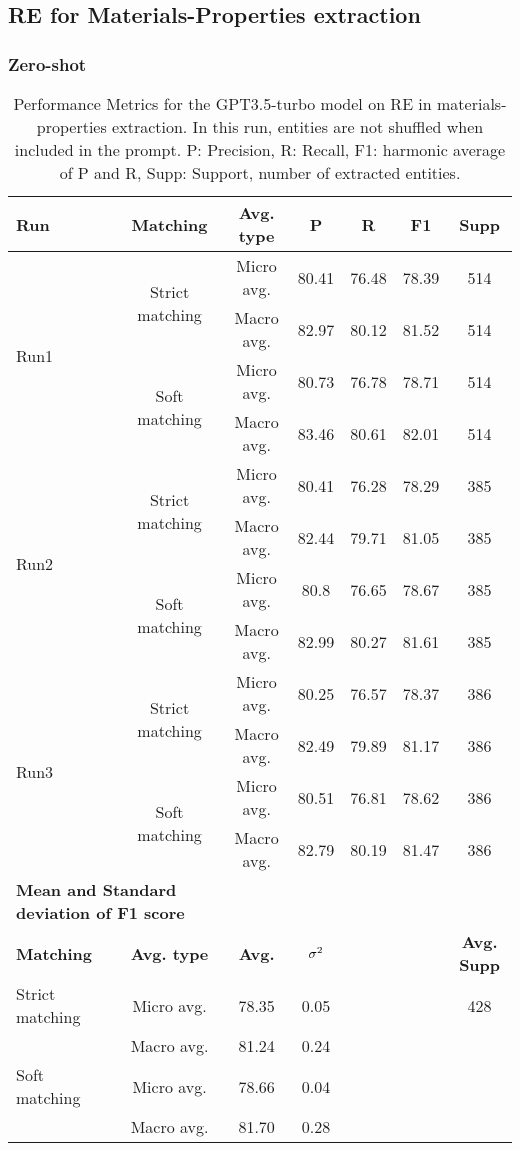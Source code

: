 \clearpage
\subsection{RE for Materials-Properties extraction}

\subsubsection{Zero-shot}

\begin{table}[htbp]
  \small
  \centering
  \caption{Performance Metrics for the GPT3.5-turbo model on RE in materials-properties extraction. In this run, entities are not shuffled when included in the prompt. P: Precision, R: Recall, F1: harmonic average of P and R, Supp: Support, number of extracted entities.}
  \begin{tabular}{lcccccc}
    \toprule
    \textbf{Run} & \textbf{Matching} & \textbf{Avg. type} & \textbf{P} & \textbf{R} & \textbf{F1} & \textbf{Supp} \\
    \midrule
    \multirow{4}{*}{Run1} & \multirow{2}{*}{Strict matching} & Micro avg. & 80.41 & 76.48 & 78.39 & 514 \\
    & & Macro avg. & 82.97 & 80.12 & 81.52 & 514 \\
    \cmidrule{2-7}
    & \multirow{2}{*}{Soft matching} & Micro avg. & 80.73 & 76.78 & 78.71 & 514 \\
    & & Macro avg. & 83.46 & 80.61 & 82.01 & 514 \\
    \midrule
    \multirow{4}{*}{Run2} & \multirow{2}{*}{Strict matching} & Micro avg. & 80.41 & 76.28 & 78.29 & 385 \\
    & & Macro avg. & 82.44 & 79.71 & 81.05 & 385 \\
    \cmidrule{2-7}
    & \multirow{2}{*}{Soft matching} & Micro avg. & 80.8 & 76.65 & 78.67 & 385 \\
    & & Macro avg. & 82.99 & 80.27 & 81.61 & 385 \\
    \midrule
    \multirow{4}{*}{Run3} & \multirow{2}{*}{Strict matching} & Micro avg. & 80.25 & 76.57 & 78.37 & 386 \\
    & & Macro avg. & 82.49 & 79.89 & 81.17 & 386 \\
    \cmidrule{2-7}
    & \multirow{2}{*}{Soft matching} & Micro avg. & 80.51 & 76.81 & 78.62 & 386 \\
    & & Macro avg. & 82.79 & 80.19 & 81.47 & 386 \\
    \midrule
    \multicolumn{2}{l}{\textbf{Mean and Standard deviation of F1 score}} & & & & & \\
    \midrule
    \textbf{Matching} & \textbf{Avg. type} & \textbf{Avg.} & $\sigma\textsuperscript{2}$ & & & \textbf{Avg. Supp}\\
    Strict matching & Micro avg. & 78.35 & 0.05 & & & 428 \\
    & Macro avg. & 81.24 & 0.24 & & & \\
    Soft matching & Micro avg. & 78.66 & 0.04 & & & \\
    & Macro avg. & 81.70 & 0.28 & & & \\
    \bottomrule
  \end{tabular}
\end{table}


